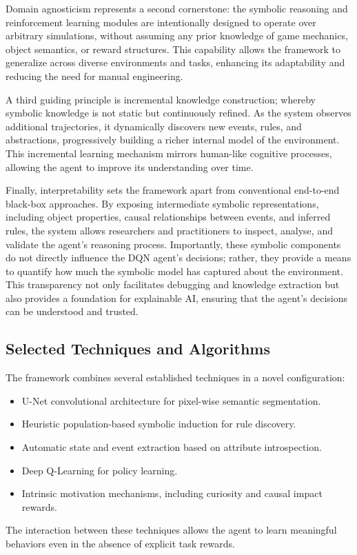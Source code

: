 \documentclass[12pt,a4paper]{report}
\begin{document}
Domain agnosticism represents a second cornerstone: the symbolic reasoning and reinforcement learning modules are intentionally designed to operate over arbitrary simulations, without assuming any prior knowledge of game mechanics, object semantics, or reward structures. This capability allows the framework to generalize across diverse environments and tasks, enhancing its adaptability and reducing the need for manual engineering.

A third guiding principle is incremental knowledge construction; whereby symbolic knowledge is not static but continuously refined. As the system observes additional trajectories, it dynamically discovers new events, rules, and abstractions, progressively building a richer internal model of the environment. This incremental learning mechanism mirrors human-like cognitive processes, allowing the agent to improve its understanding over time.

Finally, interpretability sets the framework apart from conventional end-to-end black-box approaches. By exposing intermediate symbolic representations, including object properties, causal relationships between events, and inferred rules, the system allows researchers and practitioners to inspect, analyse, and validate the agent's reasoning process. Importantly, these symbolic components do not directly influence the DQN agent's decisions; rather, they provide a means to quantify how much the symbolic model has captured about the environment. This transparency not only facilitates debugging and knowledge extraction but also provides a foundation for explainable AI, ensuring that the agent's decisions can be understood and trusted.

\subsection{Selected Techniques and Algorithms}
The framework combines several established techniques in a novel configuration:
\begin{itemize}

    \item U-Net \cite{chiave36} convolutional architecture for pixel-wise semantic segmentation.
    \item Heuristic population-based symbolic induction for rule discovery.
    \item Automatic state and event extraction based on attribute introspection.
    \item Deep Q-Learning \cite{chiave7} for policy learning.
    \item Intrinsic motivation mechanisms, including curiosity and causal impact rewards.

\end{itemize}
The interaction between these techniques allows the agent to learn meaningful behaviors even in the absence of explicit task rewards.
\end{document}
